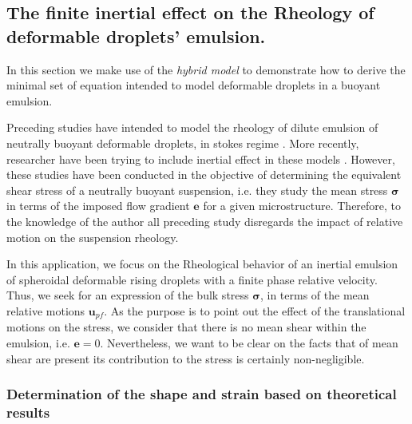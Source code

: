 \subsection{
    The finite inertial effect on the Rheology of deformable droplets' emulsion.
    }

In this section we make use of the \textit{hybrid model} to demonstrate how to derive the minimal set of equation intended to model deformable droplets in a buoyant emulsion. 

Preceding studies have intended to model the rheology of dilute emulsion of neutrally buoyant deformable droplets, in stokes regime \citep{goddard1967nonlinear,lhuillier1987phenomenology,maffettone1998equation}.
More recently, researcher have been trying to include inertial effect in these models \citet{raja2010inertial,mwasame2018macroscopic}. 
However, these studies have been conducted in the objective of determining the equivalent shear stress of a neutrally buoyant suspension, i.e. they study the mean stress $\bm{\sigma}$ in terms of the imposed flow gradient $\textbf{e}$ for a given microstructure. 
Therefore, to the knowledge of the author all preceding study disregards the impact of relative motion on the suspension rheology. 

In this application, we focus on the Rheological behavior of an inertial emulsion of spheroidal deformable rising droplets with a finite phase relative velocity. 
Thus, we seek for an expression of the bulk stress $\bm{\sigma}$, in terms of the mean relative motions $\textbf{u}_{pf}$. 
As the purpose is to point out the effect of the translational motions on the stress, we consider that there is no mean shear within the emulsion, i.e. $\textbf{e} = 0$. 
Nevertheless, we want to be clear on the facts that of mean shear are present its contribution to the stress is certainly non-negligible. 

\subsubsection*{Determination of the shape and strain based on \citet{taylor1964deformation} theoretical results}

